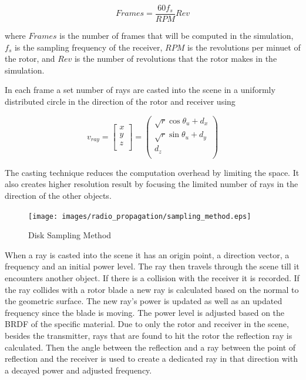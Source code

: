 \begin{equation}
	Frames = \frac{60  f_s}{RPM} Rev
	\label{eqn:frames}
\end{equation}

where $Frames$ is the number of frames that will be computed in the simulation, $f_s$ is the sampling frequency of the receiver, $RPM$ is the revolutions per minuet of the rotor, and $Rev$ is the number of revolutions that the rotor makes in the simulation.

In each frame a set number of rays are casted into the scene in a uniformly distributed circle in the direction of the rotor and receiver using

\begin{equation}
	v_{ray} = \begin{bmatrix}
			x \\
			y \\
			z \\
	\end{bmatrix}
	= \begin{pmatrix}
			\sqrt{r} \cos{\theta_u}  + d_x\\
			\sqrt{r} \sin{\theta_u}  + d_y \\
			d_z \\
	\end{pmatrix}
	\label{eqn:disk}
\end{equation}

The casting technique reduces the computation overhead by limiting the space. It also creates higher resolution result by focusing the limited number of rays in the direction of the other objects.

\begin{figure}
	\begin{center}
		\texttt{[image: images/radio\_propagation/sampling\_method.eps]}
		\caption{Disk Sampling Method}
		\label{fig:samp_method}
	\end{center}
\end{figure}

When a ray is casted into the scene it has an origin point, a direction vector, a frequency and an initial power level. The ray then travels through the scene till it encounters another object. If there is a collision with the receiver it is recorded. If the ray collides with a rotor blade a new ray is calculated based on the normal to the geometric surface. The new ray's power is updated as well as an updated frequency since the blade is moving. The power level is adjusted based on the BRDF of the specific material. Due to only the rotor and receiver in the scene, besides the transmitter, rays that are found to hit the rotor the reflection ray is calculated. Then the angle between the reflection and a ray between the point of reflection and the receiver is used to create a dedicated ray in that direction with a decayed power and adjusted frequency.

